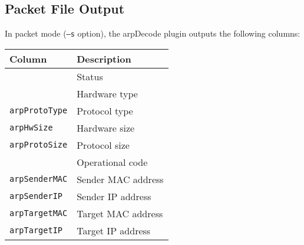\documentclass[documentation]{subfiles}
\begin{document}
\subsection{Packet File Output}
In packet mode ({\tt --s} option), the arpDecode plugin outputs the following columns:
\begin{longtable}{ll}
    \toprule
    {\bf Column} & {\bf Description}\\
    \midrule\endhead%
    {\tt \nameref{arpStat}}   & Status\\
    {\tt \nameref{arpHwType}} & Hardware type\\
    {\tt arpProtoType}        & Protocol type\\
    {\tt arpHwSize}           & Hardware size\\
    {\tt arpProtoSize}        & Protocol size\\
    {\tt \nameref{arpOpcode}} & Operational code\\
    {\tt arpSenderMAC}        & Sender MAC address\\
    {\tt arpSenderIP}         & Sender IP address\\
    {\tt arpTargetMAC}        & Target MAC address\\
    {\tt arpTargetIP}         & Target IP address\\
    \bottomrule
\end{longtable}
\end{document}
